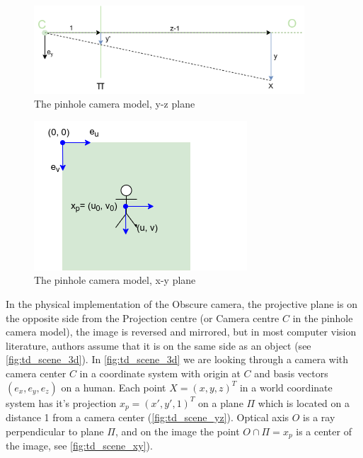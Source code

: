 \begin{figure}[h]
    \centering
    \includegraphics[width=0.9\textwidth]{graphics/td_scene_yz.png}
    \caption{The pinhole camera model, y-z plane}
    \label{fig:td_scene_yz}
\end{figure}

\begin{figure}[h]
    \centering
    \includegraphics[width=.4\textwidth]{graphics/td_scene_xy.png}
    \caption{The pinhole camera model, x-y plane}
    \label{fig:td_scene_xy}
\end{figure}

In the physical implementation of the Obscure camera, the projective plane is on the opposite side from the Projection centre (or Camera centre $C$ in the pinhole camera model), the image is reversed and mirrored, but in most computer vision literature, authors assume that it is on the same side as an object (see \autoref{fig:td_scene_3d}).
In \autoref{fig:td_scene_3d} we are looking through a camera with camera center $C$ in a coordinate system with origin at $C$ and basis vectors $(e_x, e_y, e_z)$ on a human. 
Each point $X = (x, y, z)^T$ in a world coordinate system has it's projection $x_p = (x', y', 1)^T$ on a plane $\Pi$ which is located on a distance 1 from a camera center (\autoref{fig:td_scene_yz}). 
Optical axis $O$ is a ray perpendicular to plane $\Pi$, and on the image the point $ O \cap \Pi = x_p$ is a center of the image, see \autoref{fig:td_scene_xy}).

